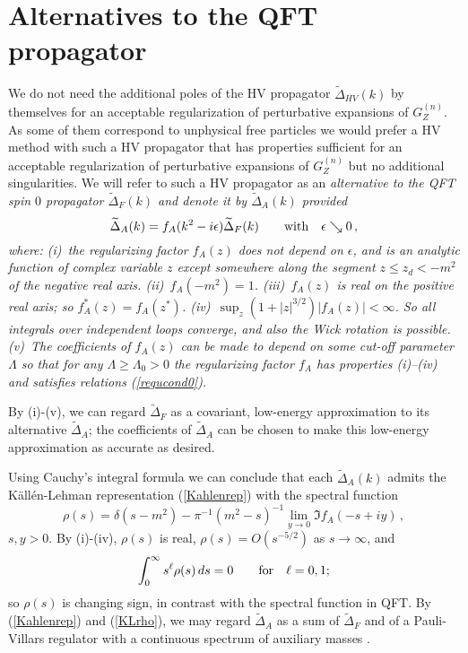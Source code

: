 \documentclass[a4paper,12pt]{article}
\newcommand{\prop}{\widetilde{\Delta}}
\newcommand{\propF}{\prop_F}
\newcommand{\propA}{\prop_A}
\newcommand{\propR}{\prop_{HV}}
\newcommand{\altreg}{f_{A}}
\newcommand{\Gf}{G^{(n)}}
\newcommand{\GfZ}{\Gf_Z}
\begin{document}
\section{Alternatives to the QFT propagator}
\label{sechighvar}

We do not need the additional poles of the HV propagator $\propR(k)$ by themselves for an acceptable regularization of perturbative expansions of $\GfZ$. As some of them correspond to unphysical free particles we would prefer a HV method with such a HV propagator that has properties sufficient for an acceptable regularization of perturbative expansions of $\GfZ$ but no additional singularities. We will refer to such a HV propagator as an \it alternative \rm to the QFT spin $0$ propagator $\propF(k)$ and denote it by $\propA(k)$ provided
\begin{equation}
   \propA(k) = \altreg(k^2 - i\epsilon) \propF(k) \qquad \hbox{with}\quad \epsilon \searrow 0 \,,
   \label{alternative}
\end{equation}
where: (i)~the regularizing factor $\altreg(z)$ does not depend on $\epsilon$, and is an analytic function of complex variable $z$ except somewhere along the segment $z \le z_d < -m^2$ of the negative real axis. (ii)~$\altreg(-m^2) = 1$. (iii)~$\altreg(z)$ is real on the positive real axis; so $\altreg^*(z) = \altreg(z^*)$. (iv)~$\sup_z (1 + |z|^{3/2}) | \altreg(z)| < \infty$. So all integrals over independent loops converge, and also the Wick rotation is possible. (v)~The coefficients of $\altreg(z)$ can be made to depend on some cut-off parameter $\Lambda$ so that for any $\Lambda \ge \Lambda_0 > 0$ the regularizing factor $\altreg$ has properties (i)--(iv) and satisfies relations (\ref{regucond0}).

By (i)-(v), we can regard $\propF$ as a covariant, low-energy approximation to its alternative $\propA$; the coefficients of $\propA$ can be chosen to make this low-energy approximation as accurate as desired.

Using Cauchy's integral formula we can conclude that each $\propA(k)$ admits the K\"all\'en-Lehman representation (\ref{Kahlenrep}) with the spectral function
\begin{equation}
   \rho(s) = \delta(s-m^2) - \pi^{-1} (m^2 -s)^{-1} \lim_{y \to 0} \Im \altreg(-s + iy) \,,
   \label{KLrho}
\end{equation}
$s, y > 0$. By (i)-(iv), $\rho(s)$ is real, $\rho(s) = O(s^{-5/2})$ as $s \to \infty$, and
\begin{equation}
   \int_0^\infty s^\ell \rho(s)\, ds = 0 \qquad\hbox{for}\quad \ell = 0, 1;
   \label{KLcon}
\end{equation}
so $\rho(s)$ is changing sign, in contrast with the spectral function in QFT. By (\ref{Kahlenrep}) and (\ref{KLrho}), we may regard $\propA$ as a sum of $\propF$ and of a Pauli-Villars regulator with a continuous spectrum of auxiliary masses \cite{Pauli}.
\end{document}
